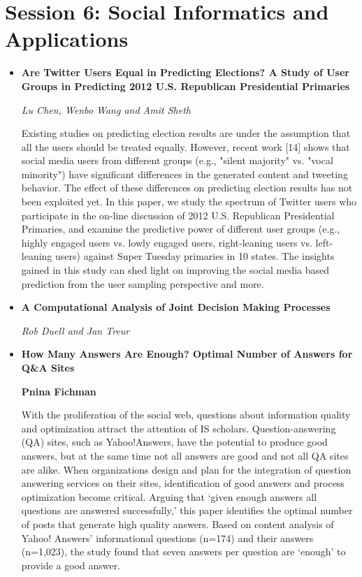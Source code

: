 \documentclass[a4paper,12pt,svgnames]{report}
\begin{document}
\section{Session 6: Social Informatics and Applications}
\begin{itemize}

\item \textbf{Are Twitter Users Equal in Predicting Elections? A Study of User
Groups in Predicting 2012 U.S. Republican Presidential Primaries}

\textit{Lu Chen, Wenbo Wang and Amit Sheth}

Existing studies on predicting election results are under the assumption that
all the users should be treated equally. However, recent work [14] shows that
social media users from different groups (e.g., "silent majority" vs. "vocal
minority") have significant differences in the generated content and tweeting
behavior. The effect of these differences on predicting election results has not
been exploited yet. In this paper, we study the spectrum of Twitter users who
participate in the on-line discussion of 2012 U.S. Republican Presidential
Primaries, and examine the predictive power of different user groups (e.g.,
highly engaged users vs. lowly engaged users, right-leaning users vs.
left-leaning users) against Super Tuesday primaries in 10 states. The insights
gained in this study can shed light on improving the social media based
prediction from the user sampling perspective and more.

\item \textbf{A Computational Analysis of Joint Decision Making Processes}

\textit{Rob Duell and Jan Treur}

\item \textbf{How Many Answers Are Enough? Optimal Number of Answers for Q\&A
Sites}

\textbf{Pnina Fichman}

With the proliferation of the social web, questions about information quality
and optimization attract the attention of IS scholars. Question-answering (QA)
sites, such as Yahoo!Answers, have the potential to produce good answers, but at
the same time not all answers are good and not all QA sites are alike. When
organizations design and plan for the integration of question answering services
on their sites, identification of good answers and process optimization become
critical. Arguing that ‘given enough answers all questions are answered
successfully,’ this paper identifies the optimal number of posts that generate
high quality answers. Based on content analysis of Yahoo! Answers’ informational
questions (n=174) and their answers (n=1,023), the study found that seven
answers per question are ‘enough’ to provide a good answer. 


\end{itemize}
\end{document}
